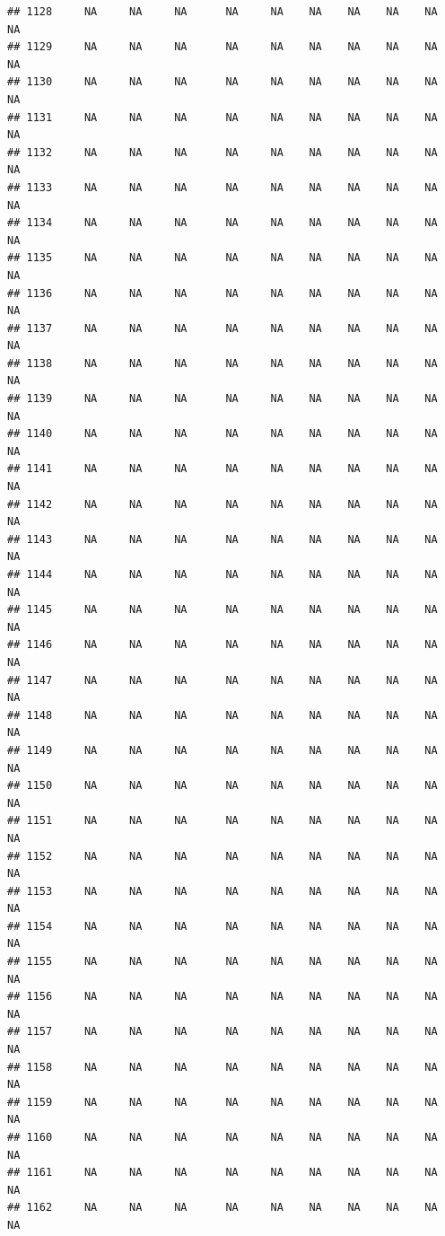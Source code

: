 \documentclass{article}\usepackage{graphicx, color}
\makeatletter
\newenvironment{kframe}{%
 \def\at@end@of@kframe{}%
 \ifinner\ifhmode%
  \def\at@end@of@kframe{\end{minipage}}%
  \begin{minipage}{\columnwidth}%
 \fi\fi%
 \def\FrameCommand##1{\hskip\@totalleftmargin \hskip-\fboxsep
 \colorbox{shadecolor}{##1}\hskip-\fboxsep
     \hskip-\linewidth \hskip-\@totalleftmargin \hskip\columnwidth}%
 \MakeFramed {\advance\hsize-\width
   \@totalleftmargin\z@ \linewidth\hsize
   \@setminipage}}%
 {\par\unskip\endMakeFramed%
 \at@end@of@kframe}
\newenvironment{knitrout}{}{} %
\makeatother
\begin{document}
\begin{knitrout}
\begin{kframe}
\begin{verbatim}
## 1128     NA     NA     NA      NA     NA    NA    NA    NA    NA     NA
## 1129     NA     NA     NA      NA     NA    NA    NA    NA    NA     NA
## 1130     NA     NA     NA      NA     NA    NA    NA    NA    NA     NA
## 1131     NA     NA     NA      NA     NA    NA    NA    NA    NA     NA
## 1132     NA     NA     NA      NA     NA    NA    NA    NA    NA     NA
## 1133     NA     NA     NA      NA     NA    NA    NA    NA    NA     NA
## 1134     NA     NA     NA      NA     NA    NA    NA    NA    NA     NA
## 1135     NA     NA     NA      NA     NA    NA    NA    NA    NA     NA
## 1136     NA     NA     NA      NA     NA    NA    NA    NA    NA     NA
## 1137     NA     NA     NA      NA     NA    NA    NA    NA    NA     NA
## 1138     NA     NA     NA      NA     NA    NA    NA    NA    NA     NA
## 1139     NA     NA     NA      NA     NA    NA    NA    NA    NA     NA
## 1140     NA     NA     NA      NA     NA    NA    NA    NA    NA     NA
## 1141     NA     NA     NA      NA     NA    NA    NA    NA    NA     NA
## 1142     NA     NA     NA      NA     NA    NA    NA    NA    NA     NA
## 1143     NA     NA     NA      NA     NA    NA    NA    NA    NA     NA
## 1144     NA     NA     NA      NA     NA    NA    NA    NA    NA     NA
## 1145     NA     NA     NA      NA     NA    NA    NA    NA    NA     NA
## 1146     NA     NA     NA      NA     NA    NA    NA    NA    NA     NA
## 1147     NA     NA     NA      NA     NA    NA    NA    NA    NA     NA
## 1148     NA     NA     NA      NA     NA    NA    NA    NA    NA     NA
## 1149     NA     NA     NA      NA     NA    NA    NA    NA    NA     NA
## 1150     NA     NA     NA      NA     NA    NA    NA    NA    NA     NA
## 1151     NA     NA     NA      NA     NA    NA    NA    NA    NA     NA
## 1152     NA     NA     NA      NA     NA    NA    NA    NA    NA     NA
## 1153     NA     NA     NA      NA     NA    NA    NA    NA    NA     NA
## 1154     NA     NA     NA      NA     NA    NA    NA    NA    NA     NA
## 1155     NA     NA     NA      NA     NA    NA    NA    NA    NA     NA
## 1156     NA     NA     NA      NA     NA    NA    NA    NA    NA     NA
## 1157     NA     NA     NA      NA     NA    NA    NA    NA    NA     NA
## 1158     NA     NA     NA      NA     NA    NA    NA    NA    NA     NA
## 1159     NA     NA     NA      NA     NA    NA    NA    NA    NA     NA
## 1160     NA     NA     NA      NA     NA    NA    NA    NA    NA     NA
## 1161     NA     NA     NA      NA     NA    NA    NA    NA    NA     NA
## 1162     NA     NA     NA      NA     NA    NA    NA    NA    NA     NA

\end{verbatim}
\end{kframe}
\end{knitrout}
\end{document}
